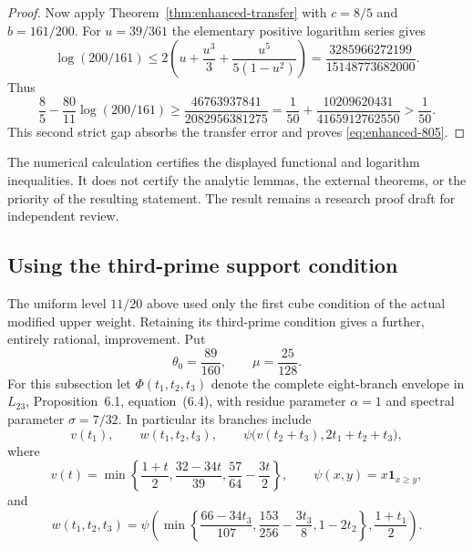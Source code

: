 \documentclass[11pt]{article}
\begin{document}
\begin{proof}
Now apply Theorem~\ref{thm:enhanced-transfer} with $c=8/5$ and
$b=161/200$. For $u=39/361$ the elementary positive logarithm series gives
\[
 \log(200/161)
 \le 2\left(u+\frac{u^3}{3}+\frac{u^5}{5(1-u^2)}\right)
 =\frac{3285966272199}{15148773682000}.
\]
Thus
\[
 \frac85-\frac{80}{11}\log(200/161)
 \ge\frac{46763937841}{2082956381275}
 =\frac1{50}+\frac{10209620431}{4165912762550}
 >\frac1{50}.
\]
This second strict gap absorbs the transfer error and proves
\eqref{eq:enhanced-805}.
\end{proof}

The numerical calculation certifies the displayed functional and
logarithm inequalities. It does not certify the analytic lemmas,
the external theorems, or the priority of the resulting statement.
The result remains a research proof draft for independent review.

\subsection{Using the third-prime support condition}
\label{sec:sharper-upper-support}

The uniform level $11/20$ above used only the first cube condition
of the actual modified upper weight. Retaining its third-prime
condition gives a further, entirely rational, improvement. Put
\[
 \theta_0=\frac{89}{160},\qquad \mu=\frac{25}{128}.
\]
For this subsection let $\Phi(t_1,t_2,t_3)$ denote the complete
eight-branch envelope in $L_{23}$, Proposition~6.1, equation~(6.4),
with residue parameter $\alpha=1$ and spectral parameter $\sigma=7/32$.
In particular its branches include
\[
 v(t_1),\qquad w(t_1,t_2,t_3),\qquad
 \psi\bigl(v(t_2+t_3),2t_1+t_2+t_3\bigr),
\]
where
\[
 v(t)=\min\left\{\frac{1+t}{2},\frac{32-34t}{39},
                         \frac{57}{64}-\frac{3t}{2}\right\},
 \qquad \psi(x,y)=x\mathbf1_{x\ge y},
\]
and
\[
 w(t_1,t_2,t_3)=\psi\left(
  \min\left\{\frac{66-34t_3}{107},
                 \frac{153}{256}-\frac{3t_3}{8},1-2t_2\right\},
  \frac{1+t_1}{2}\right).
\]
\end{document}
